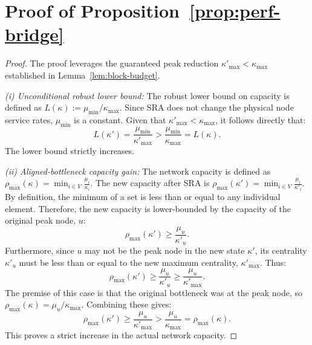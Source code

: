 \documentclass{ccjnl}
\begin{document}
\section{Proof of Proposition~\ref{prop:perf-bridge}}
\label{app:proof_prop_perf_bridge}
\begin{proof}
The proof leverages the guaranteed peak reduction $\kappa'_{\max} < \kappa_{\max}$ established in Lemma~\ref{lem:block-budget}.

\noindent\textit{(i) Unconditional robust lower bound:}
The robust lower bound on capacity is defined as $L(\kappa) := \mu_{\min}/\kappa_{\max}$.
Since SRA does not change the physical node service rates, $\mu_{\min}$ is a constant.
Given that $\kappa'_{\max} < \kappa_{\max}$, it follows directly that:
\begin{equation}
L(\kappa') = \frac{\mu_{\min}}{\kappa'_{\max}} > \frac{\mu_{\min}}{\kappa_{\max}} = L(\kappa).
\end{equation}
The lower bound strictly increases.

\noindent\textit{(ii) Aligned-bottleneck capacity gain:}
The network capacity is defined as $\rho_{\max}(\kappa) = \min_{i \in V} \frac{\mu_i}{\kappa_i}$.
The new capacity after SRA is $\rho_{\max}(\kappa') = \min_{i \in V} \frac{\mu_i}{\kappa'_i}$.
By definition, the minimum of a set is less than or equal to any individual element. Therefore, the new capacity is lower-bounded by the capacity of the original peak node, $u$:
\begin{equation}
\rho_{\max}(\kappa') \ge \frac{\mu_u}{\kappa'_u}.
\end{equation}
Furthermore, since $u$ may not be the peak node in the new state $\kappa'$, its centrality $\kappa'_u$ must be less than or equal to the new maximum centrality, $\kappa'_{\max}$. Thus:
\begin{equation}
\rho_{\max}(\kappa') \ge \frac{\mu_u}{\kappa'_u} \ge \frac{\mu_u}{\kappa'_{\max}}.
\end{equation}
The premise of this case is that the original bottleneck was at the peak node, so $\rho_{\max}(\kappa) = \mu_u/\kappa_{\max}$. Combining these gives:
\begin{equation}
\rho_{\max}(\kappa') \ge \frac{\mu_u}{\kappa'_{\max}} > \frac{\mu_u}{\kappa_{\max}} = \rho_{\max}(\kappa).
\end{equation}
This proves a strict increase in the actual network capacity.
\end{proof}





\end{document}

